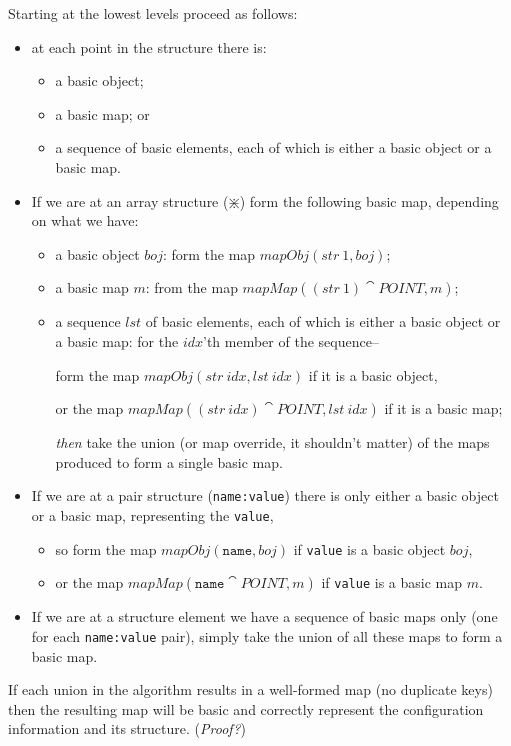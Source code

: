 \documentclass[a4paper,twoside,12pt]{article}
\begin{document}
Starting at the lowest levels proceed as follows: 
\begin{itemize}
\item at each point in the structure there is:
\begin{itemize}
\item a basic object;
\item a basic map; or
\item a sequence of basic elements, each of which is either a basic object or a basic map.
\end{itemize}


\item If we are at an array structure ($\divideontimes$) form the following basic map, depending on what we have:
\begin{itemize}
\item a basic object $boj$: form the map $mapObj (str ~ 1, boj)$;
\item a basic map $m$: from the map $mapMap ((str ~ 1) \cat POINT, m)$;
\item a sequence $lst$ of basic elements, each of which is either a basic object or a basic map: for the $idx$'th member of the sequence--

form the map $mapObj(str ~ idx, lst ~ idx)$ if it is a basic object, 

or the map $mapMap((str ~ idx) \cat POINT, lst ~ idx)$ if it is a basic map; 

\emph{then} take the union (or map override, it shouldn't matter) of the maps produced to form a single basic map.
\end{itemize}
\item If we are at a pair structure (\texttt{name:value}) there is only either a basic object or a basic map, representing the \texttt{value}, 
\begin{itemize}
\item so form the map $mapObj(\mathtt{name}, boj)$ if \texttt{value} is a basic object $boj$, 
\item or the map  $mapMap(\mathtt{name}\cat POINT, m)$ if \texttt{value} is a basic map $m$.
\end{itemize}
\item If we are at a structure element we have a sequence of basic maps only (one for each \texttt{name:value} pair), simply take the union of all these maps to form a basic map.
\end{itemize}
 
If each union in the algorithm results in a well-formed map  (no duplicate keys) then the resulting map will be basic and correctly represent the configuration information and its structure. (\emph{Proof?})
\end{document}
